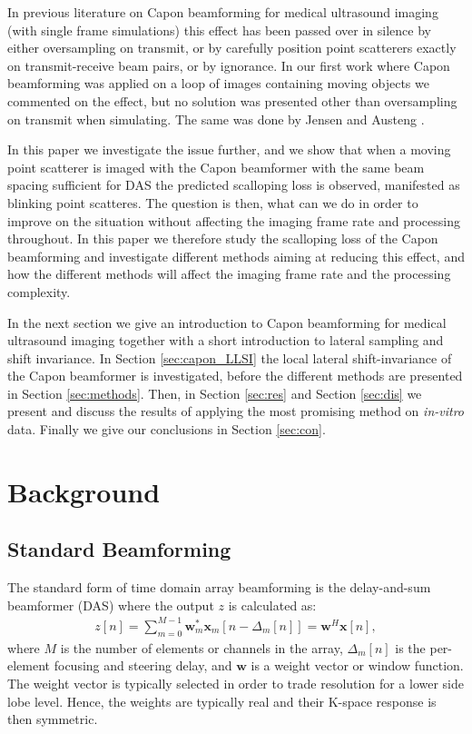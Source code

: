 \documentclass[journal]{IEEEtran}
\renewcommand{\vec}[1]{\mathbf{#1}}
\newcommand\comment[1]{\textit{{\color{red}(#1)}}}
\begin{document}
In previous literature on Capon beamforming for medical ultrasound imaging (with single frame simulations) this effect has been passed over in silence by either oversampling on transmit, or by carefully position point scatterers exactly on transmit-receive beam pairs, or by ignorance. In our first work where Capon beamforming was applied on a loop of images containing moving objects \cite{Asen2012, Asen} we commented on the effect, but no solution was presented other than oversampling on transmit when simulating. The same was done by Jensen and Austeng \cite{Jensen2012}.

In this paper we investigate the issue further, and we show that when a moving point scatterer is imaged with the Capon beamformer with the same beam spacing sufficient for DAS the predicted scalloping loss is observed, manifested as blinking point scatteres. The question is then, what can we do in order to improve on the situation without affecting the imaging frame rate and processing throughout. In this paper we therefore study the scalloping loss of the Capon beamforming and investigate different methods aiming at reducing this effect, and how the different methods will affect the imaging frame rate and the processing complexity. 

In the next section we give an introduction to Capon beamforming for medical ultrasound imaging together with a short introduction to lateral sampling and shift invariance. In Section \ref{sec:capon_LLSI} the local lateral shift-invariance of the Capon beamformer is investigated, before the different methods are presented in Section \ref{sec:methods}. Then, in Section \ref{sec:res} and Section \ref{sec:dis} we present and discuss the results of applying the most promising method on \textit{in-vitro} data. Finally we give our conclusions in Section \ref{sec:con}.



\section{Background}
\subsection{Standard Beamforming}
The standard form of time domain array beamforming is the delay-and-sum beamformer (DAS) where the output $z$ is calculated as:
\begin{align}\label{eq:das}
z[n] = \sum_{m = 0}^{M-1}\vec{w}_m^*\vec{x}_m[n - \Delta_m[n]] = \vec{w}^H\vec{x}[n],
\end{align}
where $M$ is the number of elements or channels in the array, $\Delta_m[n]$ is the per-element focusing and steering delay, and $\vec{w}$ is a weight vector or window function. The weight vector is typically selected in order to trade resolution for a lower side lobe level. Hence, the weights are typically real and their K-space response is then symmetric.
\end{document}
